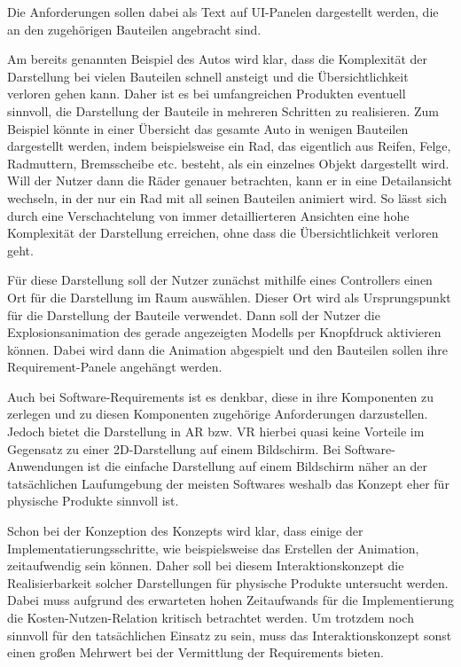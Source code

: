 Die Anforderungen sollen dabei als Text auf UI-Panelen dargestellt werden, die an den zugehörigen Bauteilen angebracht sind.

Am bereits genannten Beispiel des Autos wird klar, dass die Komplexität der Darstellung bei vielen Bauteilen schnell ansteigt und die Übersichtlichkeit verloren gehen kann.
Daher ist es bei umfangreichen Produkten eventuell sinnvoll, die Darstellung der Bauteile in mehreren Schritten zu realisieren.
Zum Beispiel könnte in einer Übersicht das gesamte Auto in wenigen Bauteilen dargestellt werden, indem beispielsweise ein Rad, das eigentlich aus Reifen, Felge, Radmuttern, Bremsscheibe etc. besteht, als ein einzelnes Objekt dargestellt wird.
Will der Nutzer dann die Räder genauer betrachten, kann er in eine Detailansicht wechseln, in der nur ein Rad mit all seinen Bauteilen animiert wird.
So lässt sich durch eine Verschachtelung von immer detaillierteren Ansichten eine hohe Komplexität der Darstellung erreichen, ohne dass die Übersichtlichkeit verloren geht.


Für diese Darstellung soll der Nutzer zunächst mithilfe eines Controllers einen Ort für die Darstellung im Raum auswählen.
Dieser Ort wird als Ursprungspunkt für die Darstellung der Bauteile verwendet.
Dann soll der Nutzer die Explosionsanimation des gerade angezeigten Modells per Knopfdruck aktivieren können.
Dabei wird dann die Animation abgespielt und den Bauteilen sollen ihre Requirement-Panele angehängt werden.

Auch bei Software-Requirements ist es denkbar, diese in ihre Komponenten zu zerlegen und zu diesen Komponenten zugehörige Anforderungen darzustellen.
Jedoch bietet die Darstellung in AR bzw. VR hierbei quasi keine Vorteile im Gegensatz zu einer 2D-Darstellung auf einem Bildschirm.
Bei Software-Anwendungen ist die einfache Darstellung auf einem Bildschirm näher an der tatsächlichen Laufumgebung der meisten Softwares weshalb das Konzept eher für physische Produkte sinnvoll ist.

Schon bei der Konzeption des Konzepts wird klar, dass einige der Implementatierungsschritte, wie beispielsweise das Erstellen der Animation, zeitaufwendig sein können.
Daher soll bei diesem Interaktionskonzept die Realisierbarkeit solcher Darstellungen für physische Produkte untersucht werden.
Dabei muss aufgrund des erwarteten hohen Zeitaufwands für die Implementierung die Kosten-Nutzen-Relation kritisch betrachtet werden.
Um trotzdem noch sinnvoll für den tatsächlichen Einsatz zu sein, muss das Interaktionskonzept sonst einen großen Mehrwert bei der Vermittlung der Requirements bieten.

